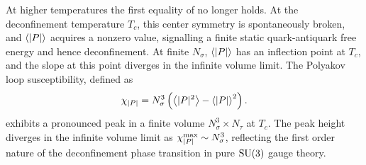 At higher temperatures the first equality of 
no longer holds. At the deconfinement temperature $T_c$, this center symmetry
is spontaneously broken, and $\ev{|P|}$ acquires a nonzero value, signalling
a finite static quark-antiquark free energy and hence deconfinement.
At finite $N_\sigma$, $\ev{|P|}$ has an inflection point at $T_c$, and
the slope at this point diverges in the infinite volume limit. The Polyakov
loop susceptibility, defined as
\begin{equation}\index{Polyakov loop!susceptibility}
  \chi_{|P|}=N_\sigma^3\left(\ev{|P|^2}-\ev{|P|}^2\right).
\end{equation}
exhibits a pronounced peak in a finite volume $N_\sigma^3\times N_\tau$ at
$T_c$. The peak height diverges in the infinite volume limit as
$\chi^{\rm max}_{|P|}\sim N_\sigma^3$, reflecting the first order nature of
the deconfinement phase transition in pure $\operatorname{SU}(3)$ gauge theory.

